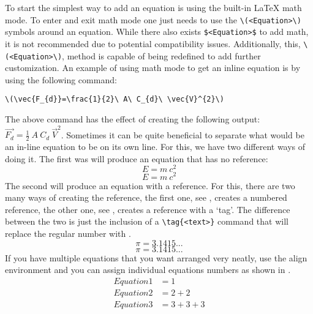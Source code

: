 		To start the simplest way to add an equation is using the built-in \LaTeX{} math mode. 
		To enter and exit math mode one just needs to use the \lstinline|\(<Equation>\)| symbols around an equation. While there also exists \lstinline|$<Equation>$| to add math, it is not recommended due to potential compatibility issues. Additionally, this, \lstinline|\(<Equation>\)|, method is capable of being redefined to add further customization. 
		An example of using math mode to get an inline equation is by using the following command:
  
		\begin{Center}
			\lstinline|\(\vec{F_{d}}=\frac{1}{2}\ A\ C_{d}\ \vec{V}^{2}\)|
		\end{Center}
  
		The above command has the effect of creating the following output: \(\vec{F_{d}}=\frac{1}{2}\ A\ C_{d}\ \vec{V}^{2}\).
		Sometimes it can be quite beneficial to separate what would be an in-line equation to be on its own line. 
		For this, we have two different ways of doing it. 
		The first was will produce an equation that has no reference:
		\[
			E = m\ c^2
		\] %
		\begin{equation*}
			E = m\ c^2
		\end{equation*}
		The second will produce an equation with a reference. 
		For this, there are two many ways of creating the reference, the first one, see , creates a numbered reference, the other one, see , creates a reference with a `tag'. 
		The difference between the two is just the inclusion of a \lstinline|\tag{<text>}| command that will replace the regular number with .
		\begin{equation}
			\label{eq:Eq}
			\pi = 3.1415...
		\end{equation}
		\begin{equation}
			\tag{Constant pi}
			\label{eq:customTag}
			\pi = 3.1415...
		\end{equation}
		If you have multiple equations that you want arranged very neatly, use the align environment and you can assign individual equations numbers as shown in .
		\begin{align}%
			\label{eq:multiref:a} Equation1 & = 1\\
			\label{eq:multiref:b} Equation2 & = 2 + 2\\
			\label{eq:multiref:c} Equation3 & = 3 + 3 + 3
		\end{align}
  
